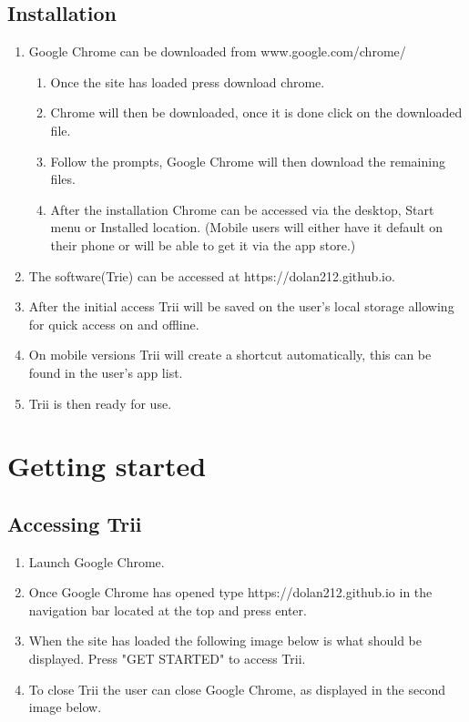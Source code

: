 \documentclass[12pt]{article}
\begin{document}
\subsection{Installation}
\begin{enumerate}
	\item Google Chrome can be downloaded from www.google.com/chrome/
	\begin{enumerate}
    	\item Once the site has loaded press download chrome.
      \item Chrome will then be downloaded, once it is done click on the downloaded file.
      \item Follow the prompts, Google Chrome will then download the remaining files.
      \item After the installation Chrome can be accessed via the desktop, Start menu or Installed location. (Mobile users will either have it default on their phone or will be able to get it via the app store.)
    \end{enumerate}
	\item The software(Trie) can be accessed at https://dolan212.github.io.
	\item After the initial access Trii will be saved on the user's local storage allowing for quick access on and offline.
	\item On mobile versions Trii will create a shortcut automatically, this can be found in the user's app list.
	\item Trii is then ready for use.
\end{enumerate}

\newpage
\section{Getting started}
\subsection{Accessing Trii}
\begin{enumerate}
  \item Launch Google Chrome.
  \item Once Google Chrome has opened type https://dolan212.github.io in the navigation bar located at the top and press enter.
  \item When the site has loaded the following image below is what should be displayed. Press "GET STARTED" to access Trii.
  \item To close Trii the user can close Google Chrome, as displayed in the second image below.
\end{enumerate}
\end{document}
